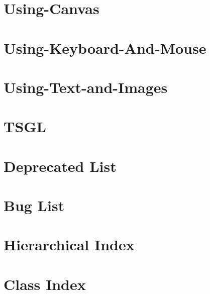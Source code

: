 \documentclass[twoside]{book}
\begin{document}
\chapter{Using-\/\-Canvas}
\label{md__home_kodemonkey_workspace__t_s_g_l_docs-wiki__using-_canvas}
\hypertarget{md__home_kodemonkey_workspace__t_s_g_l_docs-wiki__using-_canvas}{}

\chapter{Using-\/\-Keyboard-\/\-And-\/\-Mouse}
\label{md__home_kodemonkey_workspace__t_s_g_l_docs-wiki__using-_keyboard-_and-_mouse}
\hypertarget{md__home_kodemonkey_workspace__t_s_g_l_docs-wiki__using-_keyboard-_and-_mouse}{}

\chapter{Using-\/\-Text-\/and-\/\-Images}
\label{md__home_kodemonkey_workspace__t_s_g_l_docs-wiki__using-_text-and-_images}
\hypertarget{md__home_kodemonkey_workspace__t_s_g_l_docs-wiki__using-_text-and-_images}{}

\chapter{T\-S\-G\-L}
\label{md__home_kodemonkey_workspace__t_s_g_l_readme}
\hypertarget{md__home_kodemonkey_workspace__t_s_g_l_readme}{}

\chapter{Deprecated List}
\label{deprecated}
\hypertarget{deprecated}{}

\chapter{Bug List}
\label{bug}
\hypertarget{bug}{}

\chapter{Hierarchical Index}

\chapter{Class Index}

\end{document}
